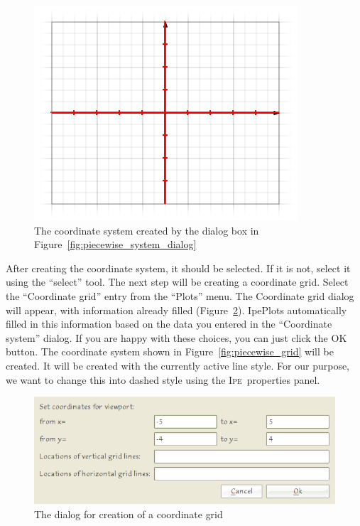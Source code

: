 \documentclass{article}
\def\Ipe{\textsc{Ipe}}
\begin{document}
\begin{figure}[h]
   \begin{center}
      \includegraphics[scale=2]{piecewise_system.png}
   \end{center}
   \caption{The coordinate system created by the dialog box in
   Figure~\ref{fig:piecewise_system_dialog}} 
   \label{fig:piecewise_system}
\end{figure}

After creating the coordinate system, it should be selected.  If it is not,
select it using the ``select'' tool. The next step will be creating a
coordinate grid.  Select the ``Coordinate grid'' entry from the ``Plots'' menu.
The Coordinate grid dialog will appear, with information already filled
(Figure~\ref{fig:piecewise_grid_dialog}).
IpePlots automatically filled in this information based on the data you
entered in the ``Coordinate system'' dialog.  If you are happy with these
choices, you can just click the OK button.  The coordinate system shown in
Figure~\ref{fig:piecewise_grid} will be created. It will be created with the
currently active line style.  For our purpose, we want to change this into
dashed style using the \Ipe\ properties panel. 

\begin{figure}[h]
   \begin{center}
      \includegraphics[scale=3]{piecewise_grid_dialog.png}
   \end{center}
   \caption{The dialog for creation of a coordinate grid}
   \label{fig:piecewise_grid_dialog}
\end{figure}
\end{document}

